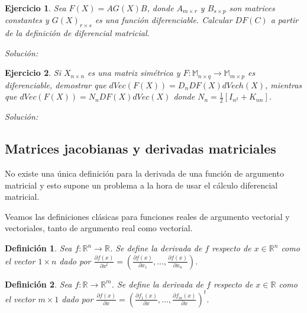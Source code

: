 \documentclass{article}
\theoremstyle{theorem-style}  %
\theoremstyle{definition-style}
\newtheorem{definition}{Definición}[section]
\theoremstyle{example-style}
\theoremstyle{exercise-style}
\newtheorem{exercise}{Ejercicio}[section]
\begin{document}
\begin{exercise}
	Sea $F(X)=AG(X)B$, donde $A_{m\times r}$ y $B_{s\times p}$ son matrices constantes y $G(X)_{r\times s}$ es una función diferenciable. Calcular $DF(C)$ a partir de la definición de diferencial matricial.
\end{exercise}
\textit{Solución:}

\begin{exercise}
	Si $X_{n\times n}$ es una matriz simétrica y $F: \mathbb{M}_{n\times q} \rightarrow \mathbb{M}_{m\times p}$ es diferenciable, demostrar que $dVec(F(X)) = D_nDF(X)dVech(X)$, mientras que $dVec(F(X)) = N_nDF(X)dVec(X)$ donde $N_n = \frac{1}{2}[I_{n^2}+K_{nn}]$.
\end{exercise}
\textit{Solución:}


\subsection{Matrices jacobianas y derivadas matriciales}

No existe una única definición para la derivada de una función de argumento matricial y esto supone un problema a la hora de usar el cálculo diferencial matricial.

Veamos las definiciones clásicas para funciones reales de argumento vectorial y vectoriales, tanto de argumento real como vectorial.

\begin{definition}
	Sea $f:\mathbb{R}^n\rightarrow \mathbb{R}$. Se define la derivada de $f$ respecto de $x\in \mathbb{R}^n$ como el vector $1\times n$ dado por $\displaystyle \frac{\partial f(x)}{\partial x^t} = \displaystyle \left( \frac{\partial f(x)}{\partial x_1},..., \frac{\partial f(x)}{\partial x_n} \right)$.
\end{definition}

\begin{definition}
	Sea $f:\mathbb{R}\rightarrow \mathbb{R}^m$. Se define la derivada de $f$ respecto de $x\in \mathbb{R}$ como el vector $m\times 1$ dado por $\displaystyle \frac{\partial f(x)}{\partial x} = \displaystyle \left( \frac{\partial f_1(x)}{\partial x},..., \frac{\partial f_m(x)}{\partial x} \right)^t$.
\end{definition}
\end{document}
